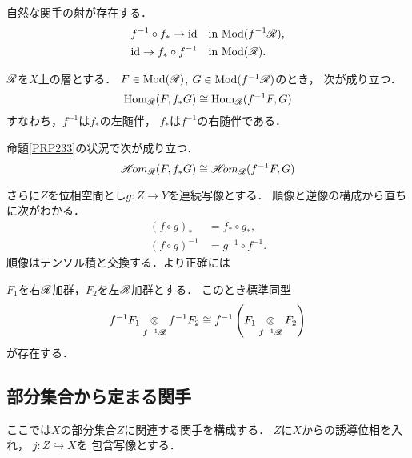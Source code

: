自然な関手の射が存在する．
\begin{align}
    f^{-1}\circ f_{\ast}\to\mathop{\mathrm{id}}\nolimits&\quad \text{in \(\mathop{\mathrm{Mod}}\nolimits(f^{-1}\mathscr{R})\),}\\
    \mathop{\mathrm{id}}\nolimits\to f_{\ast}\circ f^{-1}&\quad\text{in \(\mathop{\mathrm{Mod}}\nolimits(\mathscr{R})\).}
\end{align}

\begin{leftbar}
\begin{PRP}\label{PRP233}
    \(\mathscr{R}\)を\(X\)上の層とする．
    \(F\in\mathop{\mathrm{Mod}}\nolimits(\mathscr{R})\), \(G\in\mathop{\mathrm{Mod}}\nolimits(f^{-1}\mathscr{R})\)のとき，
    次が成り立つ．
    \begin{equation}
        \mathop{\mathrm{Hom}}\nolimits_{\mathscr{R}}(F,f_{\ast}G)
        \cong
        \mathop{\mathrm{Hom}}\nolimits_{\mathscr{R}}(f^{-1}F,G)
    \end{equation}
    すなわち，\(f^{-1}\)は\(f_{\ast}\)の左随伴，
    \(f_{\ast}\)は\(f^{-1}\)の右随伴である．
\end{PRP}
\end{leftbar}

\begin{leftbar}\begin{CRL}
    命題\ref{PRP233}の状況で次が成り立つ．
    \begin{equation}
        \mathop{\mathscr{H}\hspace{-2pt}om}\nolimits_{\mathscr{R}}(F,f_{\ast}G)
        \cong
        \mathop{\mathscr{H}\hspace{-2pt}om}\nolimits_{\mathscr{R}}(f^{-1}F,G)
    \end{equation}
\end{CRL}\end{leftbar}
    
さらに\(Z\)を位相空間とし\(g\colon Z\to Y\)を連続写像とする．
順像と逆像の構成から直ちに次がわかる．
\begin{align}
    \left(f\circ g\right)_{\ast}&=f_{\ast}\circ g_{\ast},\\
    \left(f\circ g\right)^{-1}&=g^{-1}\circ f^{-1}.
\end{align}
順像はテンソル積と交換する．より正確には
\begin{leftbar}\begin{PRP}
    \(F_1\)を右\(\mathscr{R}\)加群，\(F_2\)を左\(\mathscr{R}\)加群とする．
    このとき標準同型
    \begin{equation}
        f^{-1}F_1\ttens[f^{-1}\scR]f^{-1}F_2\cong
        f^{-1}\left(F_1\ttens[f^{-1}\scR]F_2\right)
    \end{equation}
    が存在する．
\end{PRP}\end{leftbar}
    

\subsection*{部分集合から定まる関手}
ここでは\(X\)の部分集合\(Z\)に関連する関手を構成する．
\(Z\)に\(X\)からの誘導位相を入れ，
\(j\colon Z\hookrightarrow X\)を
包含写像とする．
